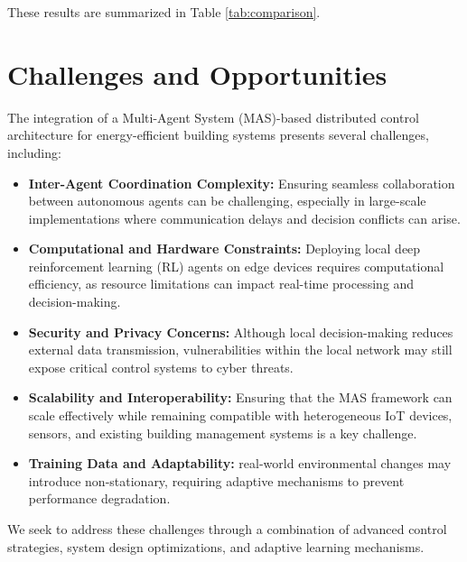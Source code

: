 \documentclass{svproc}
\begin{document}
These results are summarized in Table \ref{tab:comparison}.



\section{Challenges and Opportunities}
\label{sec:challenges}

The integration of a Multi-Agent System (MAS)-based distributed control architecture for energy-efficient building systems presents several challenges, including:

\begin{itemize}
    
    \item \textbf{Inter-Agent Coordination Complexity:} Ensuring seamless collaboration between autonomous agents can be challenging, especially in large-scale implementations where communication delays and decision conflicts can arise.
    
    \item \textbf{Computational and Hardware Constraints:} Deploying local deep reinforcement learning (RL) agents on edge devices requires computational efficiency, as resource limitations can impact real-time processing and decision-making.
    
    \item \textbf{Security and Privacy Concerns:} Although local decision-making reduces external data transmission, vulnerabilities within the local network may still expose critical control systems to cyber threats.
    
    \item \textbf{Scalability and Interoperability:} Ensuring that the MAS framework can scale effectively while remaining compatible with heterogeneous IoT devices, sensors, and existing building management systems is a key challenge.
    
    \item \textbf{Training Data and Adaptability:} real-world environmental changes may introduce non-stationary, requiring adaptive mechanisms to prevent performance degradation.

\end{itemize}

We seek to address these challenges through a combination of advanced control strategies, system design optimizations, and adaptive learning mechanisms.
\end{document}
